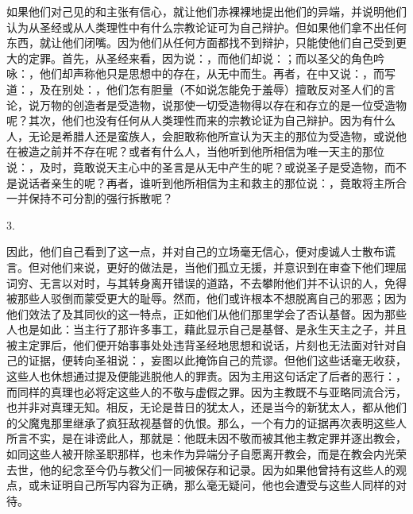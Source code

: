 如果他们对己见的和主张有信心，就让他们赤裸裸地提出他们的异端，并说明他们认为从圣经或从人类理性中有什么宗教论证可为自己辩护。但如果他们拿不出任何东西，就让他们闭嘴。因为他们从任何方面都找不到辩护，只能使他们自己受到更大的定罪。首先，从圣经来看，因为说：，而他们却说：；而以圣父的角色吟咏：，他们却声称他只是思想中的存在，从无中而生。再者，在中又说：，而写道：，及在别处：，他们怎有胆量（不如说怎能免于羞辱）擅敢反对圣人们的言论，说万物的创造者是受造物，说那使一切受造物得以存在和存立的是一位受造物呢？其次，他们也没有任何从人类理性而来的宗教论证为自己辩护。因为有什么人，无论是希腊人还是蛮族人，会胆敢称他所宣认为天主的那位为受造物，或说他在被造之前并不存在呢？或者有什么人，当他听到他所相信为唯一天主的那位说：，及时，竟敢说天主心中的圣言是从无中产生的呢？或说圣子是受造物，而不是说话者亲生的呢？再者，谁听到他所相信为主和救主的那位说：，竟敢将主所合一并保持不可分割的强行拆散呢？\par

3. \par

因此，他们自己看到了这一点，并对自己的立场毫无信心，便对虔诚人士散布谎言。但对他们来说，更好的做法是，当他们孤立无援，并意识到在审查下他们理屈词穷、无言以对时，与其转身离开错误的道路，不去攀附他们并不认识的人，免得被那些人驳倒而蒙受更大的耻辱。然而，他们或许根本不想脱离自己的邪恶；因为他们效法了及其同伙的这一特点，正如他们从他们那里学会了否认基督。因为那些人也是如此：当主行了那许多事工，藉此显示自己是基督、是永生天主之子，并且被主定罪后，他们便开始事事处处违背圣经地思想和说话，片刻也无法面对针对自己的证据，便转向圣祖说：，妄图以此掩饰自己的荒谬。但他们这些话毫无收获，这些人也休想通过提及便能逃脱他人的罪责。因为主用这句话定了后者的恶行：，而同样的真理也必将定这些人的不敬与虚假之罪。因为主教既不与亚略同流合污，也并非对真理无知。相反，无论是昔日的犹太人，还是当今的新犹太人，都从他们的父魔鬼那里继承了疯狂敌视基督的仇恨。那么，一个有力的证据再次表明这些人所言不实，是在诽谤此人，那就是：他既未因不敬而被其他主教定罪并逐出教会，如同这些人被开除圣职那样，也未作为异端分子自愿离开教会，而是在教会内光荣去世，他的纪念至今仍与教父们一同被保存和记录。因为如果他曾持有这些人的观点，或未证明自己所写内容为正确，那么毫无疑问，他也会遭受与这些人同样的对待。\par

